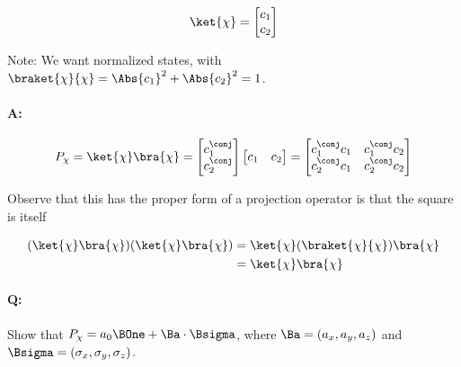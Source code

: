 \begin{equation}\label{eqn:PHY356HNov2:120}
\begin{aligned}
\ket{\chi} =
\begin{bmatrix}
c_1 \\
c_2
\end{bmatrix}
\end{aligned}
\end{equation}

Note: We want normalized states, with \(\braket{\chi}{\chi} = \Abs{c_1}^2 + \Abs{c_2}^2 = 1\).


\paragraph{A:}

\begin{equation}\label{eqn:PHY356HNov2:130}
\begin{aligned}
P_{\chi} = \ket{\chi}\bra{\chi} =
\begin{bmatrix}
c_1^\conj \\
c_2^\conj
\end{bmatrix}
\begin{bmatrix}
c_1 & c_2
\end{bmatrix}
=
\begin{bmatrix}
c_1^\conj c_1 & c_1^\conj c_2 \\
c_2^\conj c_1 & c_2^\conj c_2
\end{bmatrix}
\end{aligned}
\end{equation}

Observe that this has the proper form of a projection operator is that the square is itself

\begin{equation}\label{eqn:lecture8makingSenseOfQM:1140}
\begin{aligned}
(\ket{\chi}\bra{\chi}) (\ket{\chi}\bra{\chi})
&= \ket{\chi} (\braket{\chi}{\chi} )\bra{\chi} \\
&= \ket{\chi} \bra{\chi}
\end{aligned}
\end{equation}

\paragraph{Q:} Show that \(P_{\chi} = a_0 \BOne + \Ba \cdot \Bsigma\), where \(\Ba = (a_x, a_y, a_z)\) and \(\Bsigma = (\sigma_x, \sigma_y, \sigma_z)\).

